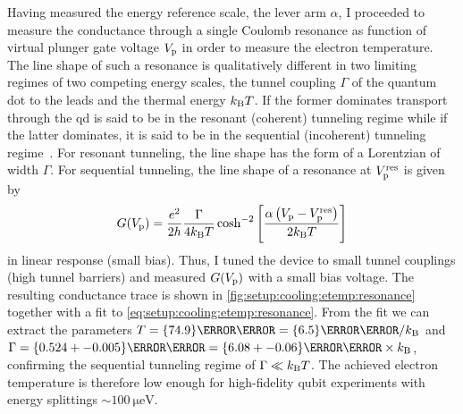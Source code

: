 Having measured the energy reference scale, the lever arm $\alpha$, I proceeded to measure the conductance through a single Coulomb resonance as function of virtual plunger gate voltage $V_{\mathrm{p}}$ in order to measure the electron temperature.
The line shape of such a resonance is qualitatively different in two limiting regimes of two competing energy scales, the tunnel coupling $\Gamma$ of the quantum dot to the leads and the thermal energy $k_{\mathrm{B}} T$.
If the former dominates transport through the \gls{qd} is said to be in the resonant (coherent) tunneling regime while if the latter dominates, it is said to be in the sequential (incoherent) tunneling regime~\cite{Beenakker1991,Ihn2009}.
For resonant tunneling, the line shape has the form of a Lorentzian of width $\Gamma$.
For sequential tunneling, the line shape of a resonance at $V_{\mathrm{p}}^{\mathrm{res}}$ is given by~\cite{Beenakker1991}
\begin{equation}\label{eq:setup:cooling:etemp:resonance}
    G(V_{\mathrm{p}}) = \frac{e^2}{2h}\frac{\Gamma}{4k_{\mathrm{B}} T}\cosh^{-2}\left[\frac{\alpha\left(V_{\mathrm{p}} - V_{\mathrm{p}}^{\mathrm{res}}\right)}{2k_{\mathrm{B}} T}\right]
\end{equation}
in linear response (small bias).
Thus, I tuned the device to small tunnel couplings (high tunnel barriers) and measured $G(V_{\mathrm{p}})$ with a small bias voltage.
The resulting conductance trace is shown in \cref{fig:setup:cooling:etemp:resonance} together with a fit to \cref{eq:setup:cooling:etemp:resonance}.
From the fit we can extract the parameters $T = \qty{74.9}{\milli\kelvin} = \qty{6.5}{\micro\eV}/\kb$ and $\Gamma = \qty{0.524+-0.005}{\micro\eV} = \qty{6.08+-0.06}{\milli\kelvin}\times\kb$, confirming the sequential tunneling regime of $\Gamma\ll k_{\mathrm{B}} T$.
The achieved electron temperature is therefore low enough for high-fidelity qubit experiments with energy splittings $\sim\qty{100}{\micro\eV}$.